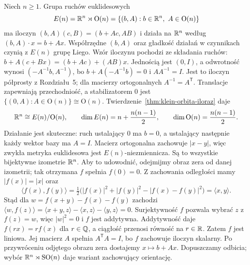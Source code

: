 \begin{przyklad}
\label{prz:klein-euklidesowa}
Niech $n\geq1$. Grupa ruchów euklidesowych
\[
 E(n)=\mathbb{R}^n\rtimes\mathrm O(n)
 =\{(b,A):b\in\mathbb{R}^n,\ A\in\mathrm O(n)\}
\]
ma iloczyn $(b,A)(c,B)=(b+Ac,AB)$ i działa na $\mathbb{R}^n$
według $(b,A)\cdot x=b+Ax$. Współrzędne $(b,A)$ oraz
gładkość działań w czynnikach czynią z $E(n)$ grupę Liego.
Wzór iloczynu pochodzi ze składania ruchów:
$b+A(c+Bx)=(b+Ac)+(AB)x$.
Jednością jest $(0,I)$, a odwrotność wynosi
$(-A^{-1}b,A^{-1})$, bo
$b+A(-A^{-1}b)=0$ i $AA^{-1}=I$.
Jest to iloczyn półprosty z Rozdziału~5;
dla macierzy ortogonalnych $A^{-1}=A^{\mathsf T}$.
Translacje zapewniają przechodniość, a stabilizatorem $0$
jest $\{(0,A):A\in\mathrm O(n)\}\cong\mathrm O(n)$.
Twierdzenie~\ref{thm:klein-orbita-iloraz} daje
\[
 \mathbb{R}^n\cong E(n)/\mathrm O(n),\qquad
 \dim E(n)=n+\frac{n(n-1)}2,\qquad
 \dim\mathrm O(n)=\frac{n(n-1)}2.
\]
Działanie jest skuteczne: ruch ustalający $0$ ma $b=0$,
a ustalający następnie każdy wektor bazy ma $A=I$.
Macierz ortogonalna zachowuje $|x-y|$, więc zwykła metryka
euklidesowa jest $E(n)$-niezmiennicza. Są to wszystkie bijektywne
izometrie $\mathbb{R}^n$. Aby to udowodnić, odejmijmy obraz zera
od danej izometrii; tak otrzymana $f$ spełnia $f(0)=0$.
Z zachowania odległości mamy $|f(x)|=|x|$ oraz
\[
 \langle f(x),f(y)\rangle
 =\tfrac12\bigl(|f(x)|^2+|f(y)|^2-|f(x)-f(y)|^2\bigr)
 =\langle x,y\rangle.
\]
Stąd dla $w=f(x+y)-f(x)-f(y)$ zachodzi
$\langle w,f(z)\rangle
=\langle x+y,z\rangle-\langle x,z\rangle-\langle y,z\rangle=0$.
Surjektywność $f$ pozwala wybrać $z$ z $f(z)=w$,
więc $|w|^2=0$ i $f$ jest addytywna.
Addytywność daje $f(rx)=rf(x)$ dla $r\in\mathbb{Q}$,
a ciągłość przenosi równość na $r\in\mathbb{R}$.
Zatem $f$ jest liniowa. Jej macierz $A$ spełnia
$A^{\mathsf T}A=I$, bo $f$ zachowuje iloczyn skalarny.
Po przywróceniu odjętego obrazu zera dostajemy $x\mapsto b+Ax$.
Dopuszczamy odbicia;
wybór $\mathbb{R}^n\rtimes\mathrm{SO}(n)$ daje wariant zachowujący
orientację.
\end{przyklad}

